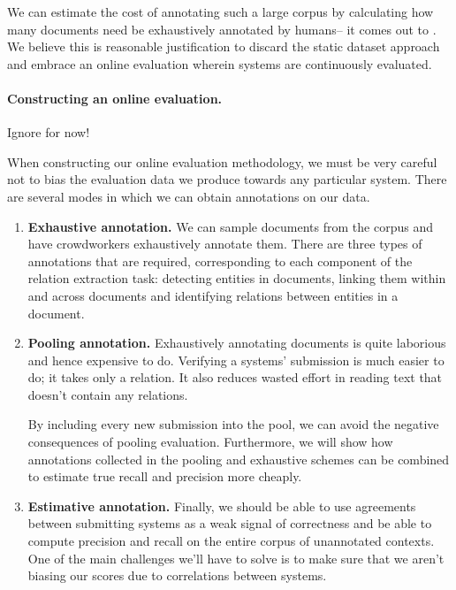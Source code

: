 We can estimate the cost of annotating such a large corpus by calculating how many documents need be exhaustively annotated by humans-- it comes out to . 
We believe this is reasonable justification to discard the static dataset approach and embrace an online evaluation wherein systems are continuously evaluated.

\paragraph{Constructing an online evaluation.}
\ac{Ignore for now!}

When constructing our online evaluation methodology, we must be very careful not to bias the evaluation data we produce towards any particular system. 
There are several modes in which we can obtain annotations on our data.

\begin{enumerate}
  \item \textbf{Exhaustive annotation.} 
    We can sample documents from the corpus and have crowdworkers exhaustively annotate them.
    There are three types of annotations that are required, corresponding to each component of the relation extraction task:
    detecting entities in documents, linking them within and across documents and identifying relations between entities in a document. 
  \item \textbf{Pooling annotation.} 
    Exhaustively annotating documents is quite laborious and hence expensive to do.
    Verifying a systems' submission is much easier to do; it takes only  a relation.
    It also reduces wasted effort in reading text that doesn't contain any relations.

    By including every new submission into the pool, we can avoid the negative consequences of pooling evaluation.
    Furthermore, we will show how annotations collected in the pooling and exhaustive schemes can be combined to estimate true recall and precision more cheaply.

  \item \textbf{Estimative annotation.} 
    Finally, we should be able to use agreements between submitting systems as a weak signal of correctness and be able to compute precision and recall on the entire corpus of unannotated contexts.
    One of the main challenges  we'll have to solve is to make sure that we aren't biasing our scores due to correlations between systems. 

\end{enumerate}

